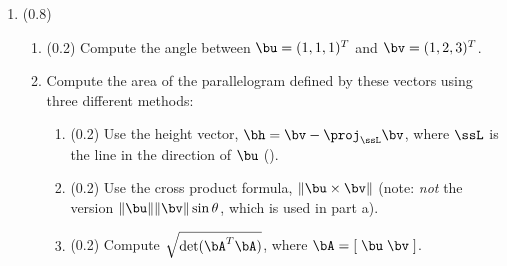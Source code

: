 \documentclass[11pt,titlepage,fleqn]{article}
\begin{document}
\begin{enumerate}
\begin{enumerate}
\item (0.2) Find the matrix $\bA$ ($T(\bx) = \bA\bx$) of the linear transformation described by
%
\begin{equation*}
T \left( \left[ \begin{array}{r} 1 \\ 0 \\ 0  \end{array} \right] \right) = \left[ \begin{array}{r} 1 \\ 1 \\ 0 \end{array} \right],
\hspace{0.5cm}
T \left( \left[ \begin{array}{r} 2 \\ 1 \\ 0  \end{array} \right] \right) = \left[ \begin{array}{r} 1 \\ 0 \\ -1 \end{array} \right],
\hspace{0.5cm}
T \left( \left[ \begin{array}{r} 3 \\ 2 \\ 1  \end{array} \right] \right) = \left[ \begin{array}{r} 0 \\ 1 \\ 1 \end{array} \right]
\end{equation*}

\end{enumerate}


\pagebreak
\item (0.8) 
\begin{enumerate}
\item (0.2) Compute the angle between $\bu = (1,1,1)^T$ and $\bv = (1,2,3)^T$.

\item Compute the area of the parallelogram defined by these vectors using three different methods:
\begin{enumerate}
\item (0.2) Use the height vector, $\bh = \bv - \proj_{\ssL} \bv$, where $\ssL$ is the line in the direction of $\bu$ ().
\item (0.2) Use the cross product formula, $\| \bu \times \bv \|$ (note: {\em not} the version $\|\bu\|\|\bv\|\sin\theta$, which is used in part a).
\item (0.2) Compute $\sqrt{\det(\bA^T \bA)}$, where $\bA = [\;\bu \; \bv\;]$.
\end{enumerate}


\end{enumerate}
\end{enumerate}
\end{document}
